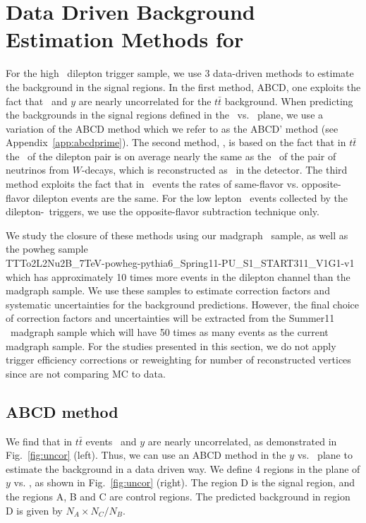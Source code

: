 \section{Data Driven Background Estimation Methods for \ttbar}
\label{sec:datadriven}

For the high \pt\ dilepton trigger sample, we use 3 data-driven methods to 
estimate the background in the signal regions. In the first method, ABCD, one exploits the fact that 
\Ht\ and $y$ are nearly uncorrelated for the $t\bar{t}$ background.
When predicting the backgrounds in the signal regions defined in the \met\ vs. \Ht\ plane,
we use a variation of the ABCD method which we refer to as the ABCD' method
(see Appendix~\ref{app:abcdprime}).
The second method, \ptll, 
is based on the fact that in $t\bar{t}$ the \pt\ of the dilepton pair is on average 
nearly the same as the \pt\ of the pair of neutrinos
from $W$-decays, which is reconstructed as \met\ in the
detector. The third method exploits the fact that in \ttbar\ events
the rates of same-flavor vs. opposite-flavor dilepton events are
the same. For the low lepton \pt\ events collected by the dilepton-\Ht\ triggers,
we use the opposite-flavor subtraction technique only.

We study the closure of these methods using our madgraph \ttbar\ sample, as well as 
the powheg sample \\
TTTo2L2Nu2B\_7TeV-powheg-pythia6\_Spring11-PU\_S1\_START311\_V1G1-v1
which has approximately 10 times more events in the dilepton channel than the madgraph sample.
We use these samples to estimate correction factors and systematic uncertainties for the background predictions. 
However, the final choice of correction factors and uncertainties will be extracted from the Summer11 \ttbar\ madgraph
sample which will have 50 times as many events as the current madgraph sample. 
For the studies presented in this section, we do not apply trigger efficiency corrections or reweighting for
number of reconstructed vertices since are not comparing MC to data. 

\subsection{ABCD method}
\label{sec:abcd}

We find that in $t\bar{t}$ events \Ht\ and 
$y$ are nearly uncorrelated, 
as demonstrated in Fig.~\ref{fig:uncor} (left).
Thus, we can use an ABCD method in the $y$ vs. \Ht\
plane to estimate the background in a data driven way. We define 4 regions in the 
plane of $y$ vs. \Ht, as shown in Fig.~\ref{fig:uncor} (right).
The region D is the signal region, and the regions A, B and C are control regions.
The predicted background in region D is given by $N_A \times N_C / N_B$.

